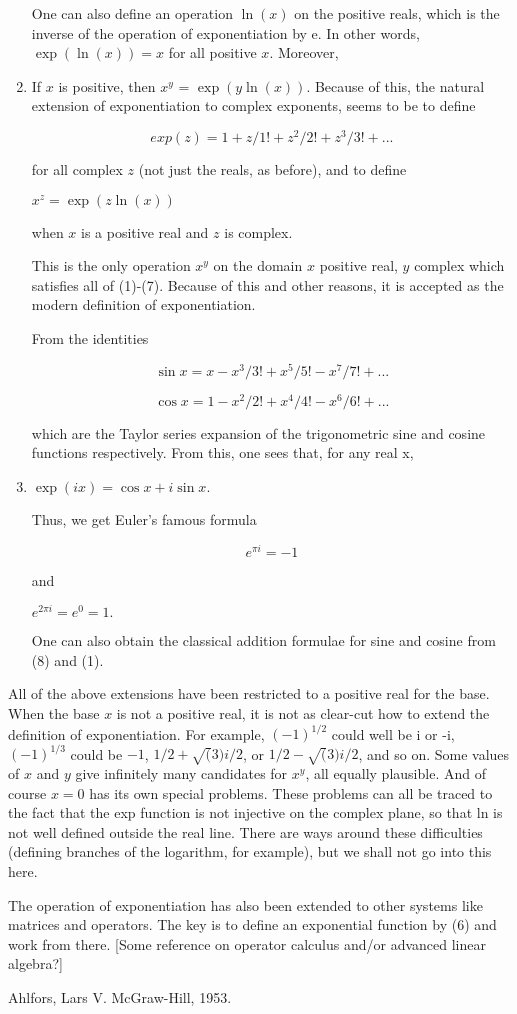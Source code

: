 \begin{enumerate}
One can also define an operation $\ln(x)$ on the positive reals, which is the
inverse of the operation of exponentiation by e.  In other words, $\exp(\ln(x))
= x$ for all positive $x$.  Moreover,

\item If $x$ is positive, then $x^y$ = $\exp(y \ln(x))$.
Because of this, the natural extension of exponentiation to complex
exponents, seems to be to define

\[ exp(z) = 1 + z/1! + z^2/2! + z^3/3! + ...\]

for all complex $z$ (not just the reals, as before), and to define

$x^z = \exp(z \ln(x))$

when $x$ is a positive real and $z$ is complex.

This is the only operation $x^y$ on the domain {$x$ positive real, $y$ complex}
which satisfies all of (1)-(7).  Because of this and other reasons, it
is accepted as the modern definition of exponentiation.

From the identities

\[ \sin x = x - x^3/3! + x^5/5! - x^7/7! + ...\]

\[ \cos x = 1 - x^2/2! + x^4/4! - x^6/6! + ... \]

which are the Taylor series expansion of the
trigonometric sine and cosine functions respectively.
From this, one sees that, for any real x,

\item $ \exp(ix) = \cos x + i \sin x.$

Thus, we get Euler's famous formula

\[e^{\pi i} = -1\]

and

$e^{2\pi i} = e^0 = 1.$

One can also obtain the classical addition formulae for sine and cosine
from (8) and (1).
\end{enumerate}

All of the above extensions have been restricted to a positive real for
the base.  When the base $x$ is not a positive real, it is not as
clear-cut how to extend the definition of exponentiation.  For example,
$(-1)^{1/2}$ could well be i or -i, $(-1)^{1/3}$ could be $-1$, $1/2 +
\sqrt(3)i/2$, or $1/2 - \sqrt(3)i/2$, and so on.  Some values of $x$ and $y$
 give
infinitely many candidates for $x^y$, all equally plausible.  And of
course $x=0$ has its own special problems.  These problems can all be
traced to the fact that the exp function is not injective on the complex
plane, so that ln is not well defined outside the real line.  There are
ways around these difficulties (defining branches of the logarithm, for
example), but we shall not go into this here.

The operation of exponentiation has also been extended to other systems
like matrices and operators.  The key is to define an exponential
function by (6) and work from there.  [Some reference on operator
calculus and/or advanced linear algebra?]

\Ref

     {Ahlfors, Lars V.}
     {McGraw-Hill, 1953.}


